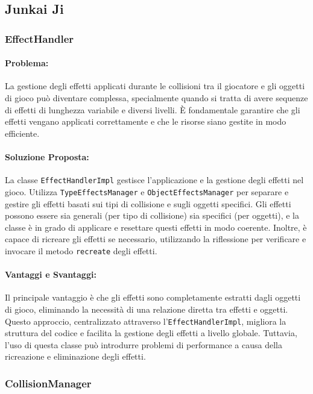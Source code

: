 \documentclass[a4paper,12pt]{report}
\begin{document}
 \subsection{Junkai Ji}
\subsubsection{EffectHandler}
\paragraph{Problema:} La gestione degli effetti applicati durante le collisioni tra il giocatore e gli oggetti di gioco può diventare complessa, specialmente quando si tratta di avere sequenze di effetti di lunghezza variabile e diversi livelli. È fondamentale garantire che gli effetti vengano applicati correttamente e che le risorse siano gestite in modo efficiente.

\paragraph{Soluzione Proposta:} La classe \texttt{EffectHandlerImpl} gestisce l’applicazione e la gestione degli effetti nel gioco. Utilizza \texttt{TypeEffectsManager} e \texttt{ObjectEffectsManager} per separare e gestire gli effetti basati sui tipi di collisione e sugli oggetti specifici. Gli effetti possono essere sia generali (per tipo di collisione) sia specifici (per oggetti), e la classe è in grado di applicare e resettare questi effetti in modo coerente. Inoltre, è capace di ricreare gli effetti se necessario, utilizzando la riflessione per verificare e invocare il metodo \texttt{recreate} degli effetti.

\paragraph{Vantaggi e Svantaggi:}
Il principale vantaggio è che gli effetti sono completamente estratti dagli oggetti di gioco, eliminando la necessità di una relazione diretta tra effetti e oggetti. Questo approccio, centralizzato attraverso l’\texttt{EffectHandlerImpl}, migliora la struttura del codice e facilita la gestione degli effetti a livello globale. Tuttavia, l’uso di questa classe può introdurre problemi di performance a causa della ricreazione e eliminazione degli effetti.

\subsubsection{CollisionManager}
\end{document}
